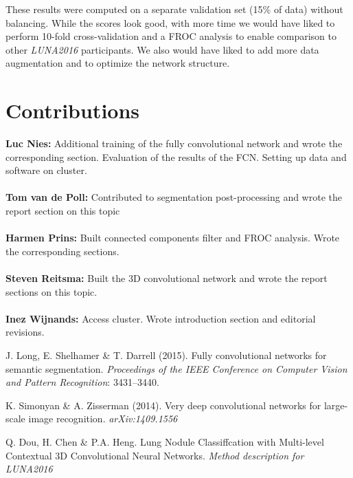 \documentclass{article}
\begin{document}
	These results were computed on a separate validation set (15\% of data) without balancing.
	While the scores look good, with more time we would have liked to perform 10-fold cross-validation and a FROC analysis to enable comparison to other \textit{LUNA2016} participants.
	We also would have liked to add more data augmentation and to optimize the network structure.
	
	\appendix
	\section{Contributions}
	\textbf{Luc Nies:} Additional training of the fully convolutional network and wrote the corresponding section. Evaluation of the results of the FCN. Setting up data and software on cluster.\\
	\\
	\textbf{Tom van de Poll:} Contributed to segmentation post-processing and wrote the report section on this topic\\
	\\
	\textbf{Harmen Prins:} Built connected components filter and FROC analysis. Wrote the corresponding sections.\\
	\\
	\textbf{Steven Reitsma:} Built the 3D convolutional network and wrote the report sections on this topic.\\
	\\
	\textbf{Inez Wijnands:} Access cluster. Wrote introduction section and editorial revisions.
	
	
	
	\begin{thebibliography}{}
		J. Long, E. Shelhamer \& T. Darrell (2015). Fully convolutional networks for semantic segmentation. \emph{Proceedings of the IEEE Conference on Computer Vision and Pattern Recognition}: 3431--3440.
		
		K. Simonyan \& A. Zisserman (2014). Very deep convolutional networks for large-scale image recognition. \emph{arXiv:1409.1556}
		
		Q. Dou, H. Chen \& P.A. Heng. Lung Nodule Classiffcation with Multi-level Contextual 3D Convolutional Neural Networks. \emph{Method description for LUNA2016}
		
		
	\end{thebibliography}
	
	
	
\end{document}
